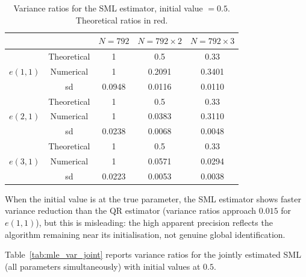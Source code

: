 \documentclass[12pt]{article}
\begin{document}
\begin{table}[H]
\centering
\caption{Variance ratios for the SML estimator, initial value $=0.5$.
Theoretical ratios in red.}
\label{tab:mle_var_ini05}
\begin{tabular}{lcccc}
\toprule
 & & $N=792$ & $N=792\times2$ & $N=792\times3$ \\
\midrule
\multirow{3}{*}{$e(1,1)$}
 & Theoretical & \textcolor{myred}{1} & \textcolor{myred}{0.5} & \textcolor{myred}{0.33} \\
 & Numerical   & 1 & 0.2091 & 0.3401 \\
 & sd          & 0.0948 & 0.0116 & 0.0110 \\
\midrule
\multirow{3}{*}{$e(2,1)$}
 & Theoretical & \textcolor{myred}{1} & \textcolor{myred}{0.5} & \textcolor{myred}{0.33} \\
 & Numerical   & 1 & 0.0383 & 0.3110 \\
 & sd          & 0.0238 & 0.0068 & 0.0048 \\
\midrule
\multirow{3}{*}{$e(3,1)$}
 & Theoretical & \textcolor{myred}{1} & \textcolor{myred}{0.5} & \textcolor{myred}{0.33} \\
 & Numerical   & 1 & 0.0571 & 0.0294 \\
 & sd          & 0.0223 & 0.0053 & 0.0038 \\
\bottomrule
\end{tabular}
\end{table}

\noindent
When the initial value is at the true parameter, the SML estimator shows
faster variance reduction than the QR estimator (variance ratios approach
$0.015$ for $e(1,1)$), but this is misleading: the high apparent precision
reflects the algorithm remaining near its initialisation, not genuine global
identification.

Table~\ref{tab:mle_var_joint} reports variance ratios for the jointly
estimated SML (all parameters simultaneously) with initial values at $0.5$.
\end{document}
